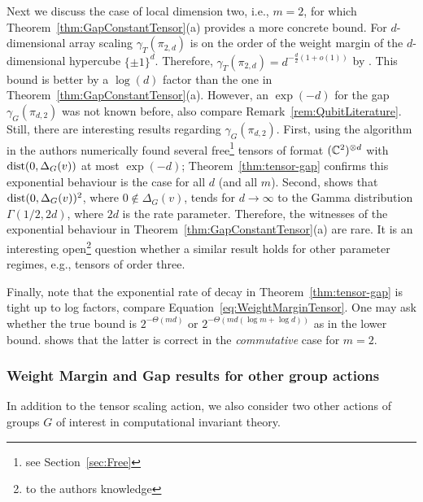 Next we discuss the case of local dimension two, i.e., $m=2$, for which Theorem~\ref{thm:GapConstantTensor}(a) provides a more concrete bound.  For $d$-dimensional array scaling $\gamma_T(\pi_{2,d})$ is on the order of the weight margin of the $d$-dimensional hypercube $\{\pm 1\}^d$. Therefore, $\gamma_T(\pi_{2,d}) = d^{-\frac{d}{2}(1 + o(1))}$ by \cite{alon1997anti}. This bound is better by a $\log(d)$ factor than the one in Theorem~\ref{thm:GapConstantTensor}(a). However, an $\exp(-d)$ for the gap $\gamma_G(\pi_{d,2})$ was not known before, also compare Remark~\ref{rem:QubitLiterature}.
Still, there are interesting results regarding $\gamma_G(\pi_{d,2})$. First, using the algorithm in \cite{MaciazekSawicki2015} the authors numerically found several free\footnote{see Section~\ref{sec:Free}} tensors of format $(\mathbb C^{2})^{\otimes d}$ with $\operatorname{dist}(0, \Delta_G(v))$ at most $\exp(-d)$; Theorem~\ref{thm:tensor-gap} confirms this exponential behaviour is the case for all $d$ (and all $m$). Second, \cite[Main result]{MaciazekSawicki2018} shows that $\operatorname{dist}(0,\Delta_{G}(v))^2$, where $0 \notin \Delta_G(v)$, tends for $d \to \infty$ to the Gamma distribution $\Gamma(1/2, 2d)$, where $2d$ is the rate parameter. Therefore, the witnesses of the exponential behaviour in Theorem~\ref{thm:GapConstantTensor}(a) are rare. It is an interesting open\footnote{to the authors knowledge} question whether a similar result holds for other parameter regimes, e.g., tensors of order three.

Finally, note that the exponential rate of decay in Theorem~\ref{thm:tensor-gap} is tight up to log factors, compare Equation~\eqref{eq:WeightMarginTensor}. One may ask whether the true bound is $2^{-\Theta(m d)}$ or $2^{- \Theta( md (\log m + \log d))}$ as in the lower bound. \cite{alon1997anti} shows that the latter is correct in the \emph{commutative} case for $m=2$.






\subsubsection*{Weight Margin and Gap results for other group actions}

In addition to the tensor scaling action, we also consider two other actions of groups $G$ of interest in computational invariant theory.

